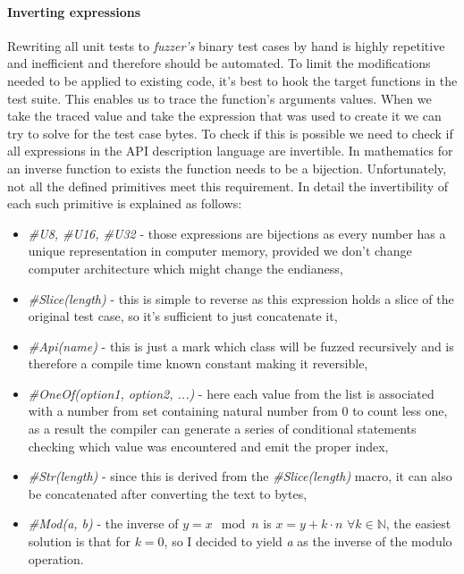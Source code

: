 \paragraph{Inverting expressions}
Rewriting all unit tests to \textit{fuzzer's} binary test cases by hand is highly repetitive and inefficient and therefore should be automated. To limit the modifications needed to be applied to existing code, it's best to hook the target functions in the test suite. This enables us to trace the function's arguments values. When we take the traced value and take the expression that was used to create it we can try to solve for the test case bytes. To check if this is possible we need to check if all expressions in the API description language are invertible. In mathematics for an inverse function to exists the function needs to be a bijection. Unfortunately, not all the defined primitives meet this requirement. In detail the invertibility of each such primitive is explained as follows:
\begin{itemize}
    \item \textit{\#U8, \#U16, \#U32} - those expressions are bijections as every number has a unique representation in computer memory, provided we don't change computer architecture which might change the endianess,
    \item \textit{\#Slice(length)} - this is simple to reverse as this expression holds a slice of the original test case, so it's sufficient to just concatenate it,
    \item \textit{\#Api(name)} - this is just a mark which class will be fuzzed recursively and is therefore a compile time known constant making it reversible,
    \item \textit{\#OneOf(option1, option2, ...)} - here each value from the list is associated with a number from set containing natural number from 0 to count less one, as a result the compiler can generate a series of conditional statements checking which value was encountered and emit the proper index,
    \item \textit{\#Str(length)} - since this is derived from the \textit{\#Slice(length)} macro, it can also be concatenated after converting the text to bytes,
    \item \textit{\#Mod(a, b)} - the inverse of $y = x \mod n$ is $x = y + k \cdot n$ $\forall k \in \mathbb{N}$, the easiest solution is that for $ k=0 $, so I decided to yield \textit{a} as the inverse of the modulo operation.
\end{itemize}
